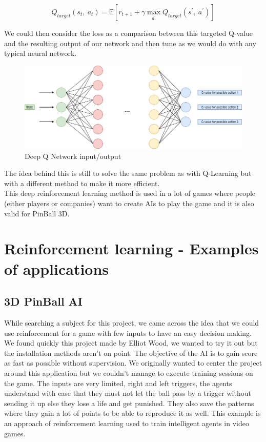 \documentclass[a4paper,12pt,calibri,oneside,openany]{book}
\theoremstyle{break}
\begin{document}
$$
Q_{target} (s_t,\ a_t)=\mathbb{E}\left[ r_{t+1}+\gamma \max_{a^{'}} Q_{target}(s^{'},\ a^{'}) \right] 
$$

We could then consider the loss as a comparison between this targeted Q-value and the resulting output of our network and then tune as we would do with any typical neural network.\\

\begin{figure}[H]
	\centering\includegraphics[width=\linewidth]{DQN}
	\caption{Deep Q Network input/output}
\end{figure}

The idea behind this is still to solve the same problem as with Q-Learning but with a different method to make it more efficient.\\

This deep reinforcement learning method is used in a lot of games where people (either players or companies) want to create AIs to play the game and it is also valid for PinBall 3D.

\chapter{Reinforcement learning - Examples of applications}
\section{3D PinBall AI}
\qquad While searching a subject for this project, we came across the idea that we could use reinforcement for a game with few inputs to have an easy decision making. We found quickly this project made by Elliot Wood, we wanted to try it out but the installation methods aren't on point. The objective of the AI is to gain score as fast as possible without supervision. We originally wanted to center the project around this application but we couldn't manage to execute training sessions on the game. The inputs are very limited, right and left triggers, the agents understand with ease that they must not let the ball pass by a trigger without sending it up else they lose a life and get punished. They also save the patterns where they gain a lot of points to be able to reproduce it as well. This example is an approach of reinforcement learning used to train intelligent agents in video games. 
\end{document}
